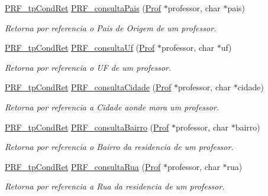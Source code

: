 \begin{DoxyCompactItemize}
\hyperlink{group__modulo_professor_ga777e215896d573d2e99d98793b1f0ed1}{P\+R\+F\+\_\+tp\+Cond\+Ret} \hyperlink{group__funcoes_consulta_ga330d3968561d75935ce224251cc656b8}{P\+R\+F\+\_\+consulta\+Pais} (\hyperlink{structprof}{Prof} $\ast$professor, char $\ast$pais)
\begin{DoxyCompactList}\small\item\em Retorna por referencia o Pais de Origem de um professor. \end{DoxyCompactList}\item 
\hyperlink{group__modulo_professor_ga777e215896d573d2e99d98793b1f0ed1}{P\+R\+F\+\_\+tp\+Cond\+Ret} \hyperlink{group__funcoes_consulta_gacda7cddf718a46f03b278817100758c2}{P\+R\+F\+\_\+consulta\+Uf} (\hyperlink{structprof}{Prof} $\ast$professor, char $\ast$uf)
\begin{DoxyCompactList}\small\item\em Retorna por referencia o UF de um professor. \end{DoxyCompactList}\item 
\hyperlink{group__modulo_professor_ga777e215896d573d2e99d98793b1f0ed1}{P\+R\+F\+\_\+tp\+Cond\+Ret} \hyperlink{group__funcoes_consulta_ga2de6ca98fdf2c21b329dec040d49429f}{P\+R\+F\+\_\+consulta\+Cidade} (\hyperlink{structprof}{Prof} $\ast$professor, char $\ast$cidade)
\begin{DoxyCompactList}\small\item\em Retorna por referencia a Cidade aonde mora um professor. \end{DoxyCompactList}\item 
\hyperlink{group__modulo_professor_ga777e215896d573d2e99d98793b1f0ed1}{P\+R\+F\+\_\+tp\+Cond\+Ret} \hyperlink{group__funcoes_consulta_gab2fb73bef414349be7908fc2cd1eef92}{P\+R\+F\+\_\+consulta\+Bairro} (\hyperlink{structprof}{Prof} $\ast$professor, char $\ast$bairro)
\begin{DoxyCompactList}\small\item\em Retorna por referencia o Bairro da residencia de um professor. \end{DoxyCompactList}\item 
\hyperlink{group__modulo_professor_ga777e215896d573d2e99d98793b1f0ed1}{P\+R\+F\+\_\+tp\+Cond\+Ret} \hyperlink{group__funcoes_consulta_ga81a5d9fbbd4075120126fb58850c46c5}{P\+R\+F\+\_\+consulta\+Rua} (\hyperlink{structprof}{Prof} $\ast$professor, char $\ast$rua)
\begin{DoxyCompactList}\small\item\em Retorna por referencia a Rua da residencia de um professor. \end{DoxyCompactList}\item 

\end{DoxyCompactItemize}
